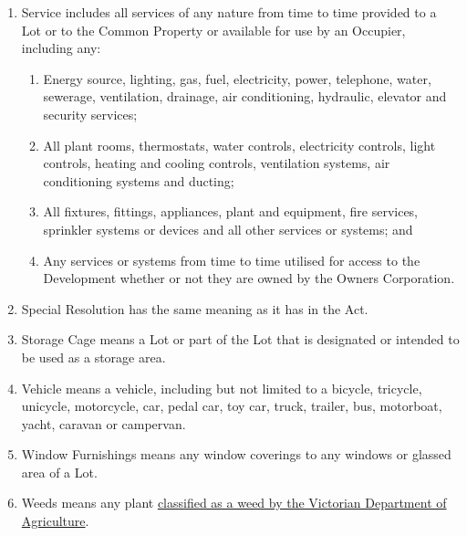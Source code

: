 \documentclass{article}
\begin{document}
\begin{enumerate}[label=\arabic*.]
\begin{enumerate}[label=\arabic{enumi}.\arabic*.]
\begin{enumerate}[label=(\arabic*)]
\item  Service includes all services of any nature from time to time provided to a Lot or to the Common Property or available for use by an Occupier, including any:

\begin{enumerate}[label=(\alph*)]

\item  Energy source, lighting, gas, fuel, electricity, power, telephone, water, sewerage, ventilation, drainage, air conditioning, hydraulic, elevator and security services;

\item  All plant rooms, thermostats, water controls, electricity controls, light controls, heating and cooling controls, ventilation systems, air conditioning systems and ducting;

\item  All fixtures, fittings, appliances, plant and equipment, fire services, sprinkler systems or devices and all other services or systems; and

\item  Any services or systems from time to time utilised for access to the Development whether or not they are owned by the Owners Corporation.

\end{enumerate}

\item  Special Resolution has the same meaning as it has in the Act.

\item  Storage Cage means a Lot or part of the Lot that is designated or intended to be used as a storage area.

\item  Vehicle means a vehicle, including but not limited to a bicycle, tricycle, unicycle, motorcycle, car, pedal car, toy car, truck, trailer, bus, motorboat, yacht, caravan or campervan.

\item  Window Furnishings means any window coverings to any windows or glassed area of a Lot.

\item Weeds means any plant \href{https://agriculture.vic.gov.au/biosecurity/weeds#:~:text=Weeds%20are%20a%20threat%20to%20primary%20production%20and,threat%20to%20primary%20production%20and%20biodiversity%20in%20Victoria}{classified as a weed by the Victorian Department of Agriculture}.

\end{enumerate}


\end{enumerate}
\end{enumerate}
\end{document}
